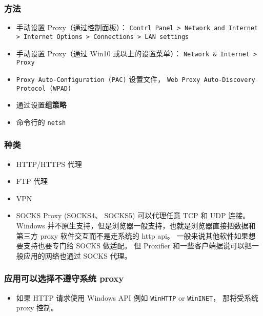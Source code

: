 
\subsubsection{方法}
\begin{itemize}
\item 手动设置 Proxy（通过控制面板）： \verb`Contrl Panel > Network and Internet > Internet Options > Connections > LAN settings`
\item 手动设置 Proxy（通过 Win10 或以上的设置菜单）： \verb`Network & Internet > Proxy`
\item \verb`Proxy Auto-Configuration (PAC)` 设置文件， \verb`Web Proxy Auto-Discovery Protocol (WPAD)`
\item 通过设置\textbf{组策略}
\item 命令行的 \verb`netsh`
\end{itemize}

\subsubsection{种类}
\begin{itemize}
\item HTTP/HTTPS 代理
\item FTP 代理
\item VPN
\item SOCKS Proxy (SOCKS4、 SOCKS5) 可以代理任意 TCP 和 UDP 连接。Windows 并不原生支持，但是浏览器一般支持，也就是浏览器直接把数据和第三方 proxy 软件交互而不是走系统的 http api。 一般来说其他软件如果想要支持也要专门给 SOCKS 做适配。 但 Proxifier 和一些客户端据说可以把一般应用的网络也通过 SOCKS 代理。
\end{itemize}

\subsubsection{应用可以选择不遵守系统 proxy}
\begin{itemize}
\item 如果 HTTP 请求使用 Windows API 例如 \verb`WinHTTP` or \verb`WinINET`， 那将受系统 proxy 控制。
\end{itemize}
